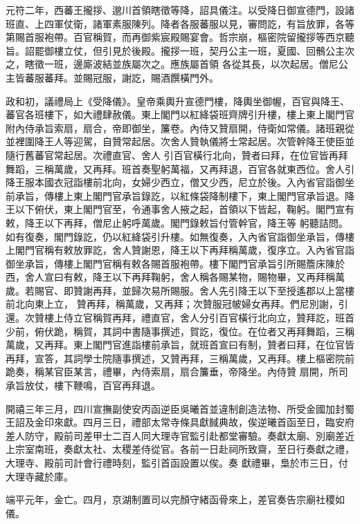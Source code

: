 \begin{pinyinscope}
 元符二年，西蕃王攏拶、邈川首領瞎徵等降，詔具儀注。以受降日御宣德門，設諸班直、上四軍仗衛，諸軍素服陳列。降者各服蕃服以見，審問訖，有旨放罪，各等第賜首服袍帶。百官稱賀，而再御紫宸殿賜宴會。哲宗崩，樞密院留攏拶等西京聽旨。詔罷御樓立仗，但引見於後殿。攏拶一班，契丹公主一班，夏國、回鶻公主次之，瞎徵一班，邊廝波結並族屬次之。應族屬首領
 各從其長，以次起居。僧尼公主皆蕃服蕃拜。並賜冠服，謝訖，賜酒饌橫門外。



 政和初，議禮局上《受降儀》。皇帝乘輿升宣德門樓，降輿坐御幄，百官與降王、蕃官各班樓下，如大禮肆赦儀。東上閣門以紅絳袋班齊牌引升樓，樓上東上閣門官附內侍承旨索扇，扇合，帝即御坐，簾卷。內侍又贊扇開，侍衛如常儀。諸班親從並裡圍降王人等迎駕，自贊常起居。次舍人贊執儀將士常起居。次管幹降王使臣並隨行舊蕃官常起居。次禮直官、舍人
 引百官橫行北向，贊者曰拜，在位官皆再拜舞蹈，三稱萬歲，又再拜。班首奏聖躬萬福，又再拜退，百官各就東西位。舍人引降王服本國衣冠詣樓前北向，女婦少西立，僧又少西，尼立於後。入內省官詣御坐前承旨，傳樓上東上閣門官承旨錄訖，以紅條袋降制樓下，東上閣門官承旨退。降王以下俯伏，東上閣門官至，令通事舍人掖之起，首領以下皆起，鞠躬。閣門宣有敕，降王以下再拜，僧尼止躬呼萬歲。閣門錄敕旨付管幹官，降王等
 躬聽詰問。如有復奏，閣門錄訖，仍以紅絳袋引升樓。如無復奏，入內省官詣御坐承旨，傳樓上閣門官稱有敕放罪訖，舍人贊謝恩，降王以下再拜稱萬歲，復序立。入內省官詣御坐承旨，傳樓上閣門官稱有敕各賜首服袍帶。樓下閣門官承旨引所賜簷床陳於西，舍人宣曰有敕，降王以下再拜鞠躬，舍人稱各賜某物，賜物畢，又再拜稱萬歲。若賜官、即贊謝再拜，並歸次易所賜服。舍人先引降王以下至授遙郡以上當樓前北向東上立，
 贊再拜，稱萬歲，又再拜；次贊服冠帔婦女再拜。們尼別謝，引還。次贊樓上侍立官稱賀再拜，禮直官，舍人分引百官橫行北向立，贊拜訖，班首少前，俯伏跪，稱賀，其詞中書隨事撰述，賀訖，復位。在位者又再拜舞蹈，三稱萬歲，又再拜。東上閣門官進詣樓前承旨，就班首宣曰有制，贊者曰拜，在位官皆再拜，宣答，其詞學士院隨事撰述，又贊再拜，三稱萬歲，又再拜。樓上樞密院前跪奏，稱某官臣某言，禮畢，內侍索扇，扇合簾垂，帝降坐。內侍贊
 扇開，所司承旨放仗，樓下鞭鳴，百官再拜退。



 開禧三年三月，四川宣撫副使安丙函逆臣吳曦首並違制創造法物、所受金國加封蜀王詔及金印來獻。四月三日，禮部太常寺條具獻馘典故，俟逆曦首函至日，臨安府差人防守，殿前司差甲士二百人同大理寺官監引赴都堂審驗。奏獻太廟、別廟差近上宗室南班，奏獻太社、太稷差侍從官。各前一日赴祠所致齋，至日行奏獻之禮，大理寺、殿前司計會行禮時刻，監引首函設置以俟。奏
 獻禮畢，梟於市三日，付大理寺藏於庫。



 端平元年，金亡。四月，京湖制置司以完顏守緒函骨來上，差官奏告宗廟社稷如儀。




\end{pinyinscope}
